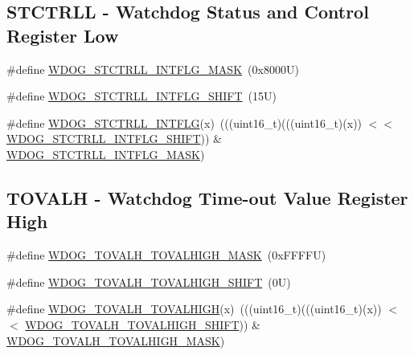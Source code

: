 \subsection*{S\+T\+C\+T\+R\+LL -\/ Watchdog Status and Control Register Low}
\begin{DoxyCompactItemize}
\item 
\#define \mbox{\hyperlink{group___w_d_o_g___register___masks_ga28985249246b9ad12b7f4e50d5d1ee46}{W\+D\+O\+G\+\_\+\+S\+T\+C\+T\+R\+L\+L\+\_\+\+I\+N\+T\+F\+L\+G\+\_\+\+M\+A\+SK}}~(0x8000\+U)
\item 
\#define \mbox{\hyperlink{group___w_d_o_g___register___masks_ga672e303cca0aaea64e48b5e632a2e666}{W\+D\+O\+G\+\_\+\+S\+T\+C\+T\+R\+L\+L\+\_\+\+I\+N\+T\+F\+L\+G\+\_\+\+S\+H\+I\+FT}}~(15\+U)
\item 
\#define \mbox{\hyperlink{group___w_d_o_g___register___masks_gaf2526424e72389c3136332c8e8c68514}{W\+D\+O\+G\+\_\+\+S\+T\+C\+T\+R\+L\+L\+\_\+\+I\+N\+T\+F\+LG}}(x)~(((uint16\+\_\+t)(((uint16\+\_\+t)(x)) $<$$<$ \mbox{\hyperlink{group___w_d_o_g___register___masks_ga672e303cca0aaea64e48b5e632a2e666}{W\+D\+O\+G\+\_\+\+S\+T\+C\+T\+R\+L\+L\+\_\+\+I\+N\+T\+F\+L\+G\+\_\+\+S\+H\+I\+FT}})) \& \mbox{\hyperlink{group___w_d_o_g___register___masks_ga28985249246b9ad12b7f4e50d5d1ee46}{W\+D\+O\+G\+\_\+\+S\+T\+C\+T\+R\+L\+L\+\_\+\+I\+N\+T\+F\+L\+G\+\_\+\+M\+A\+SK}})
\end{DoxyCompactItemize}
\subsection*{T\+O\+V\+A\+LH -\/ Watchdog Time-\/out Value Register High}
\begin{DoxyCompactItemize}
\item 
\#define \mbox{\hyperlink{group___w_d_o_g___register___masks_ga3b934300a204f2b11fefc7961dc25f55}{W\+D\+O\+G\+\_\+\+T\+O\+V\+A\+L\+H\+\_\+\+T\+O\+V\+A\+L\+H\+I\+G\+H\+\_\+\+M\+A\+SK}}~(0x\+F\+F\+F\+F\+U)
\item 
\#define \mbox{\hyperlink{group___w_d_o_g___register___masks_ga6729532c2b047c0d3327ffcf7357825c}{W\+D\+O\+G\+\_\+\+T\+O\+V\+A\+L\+H\+\_\+\+T\+O\+V\+A\+L\+H\+I\+G\+H\+\_\+\+S\+H\+I\+FT}}~(0\+U)
\item 
\#define \mbox{\hyperlink{group___w_d_o_g___register___masks_ga10c7007564832595b6bd8de07770a9fa}{W\+D\+O\+G\+\_\+\+T\+O\+V\+A\+L\+H\+\_\+\+T\+O\+V\+A\+L\+H\+I\+GH}}(x)~(((uint16\+\_\+t)(((uint16\+\_\+t)(x)) $<$$<$ \mbox{\hyperlink{group___w_d_o_g___register___masks_ga6729532c2b047c0d3327ffcf7357825c}{W\+D\+O\+G\+\_\+\+T\+O\+V\+A\+L\+H\+\_\+\+T\+O\+V\+A\+L\+H\+I\+G\+H\+\_\+\+S\+H\+I\+FT}})) \& \mbox{\hyperlink{group___w_d_o_g___register___masks_ga3b934300a204f2b11fefc7961dc25f55}{W\+D\+O\+G\+\_\+\+T\+O\+V\+A\+L\+H\+\_\+\+T\+O\+V\+A\+L\+H\+I\+G\+H\+\_\+\+M\+A\+SK}})
\end{DoxyCompactItemize}

